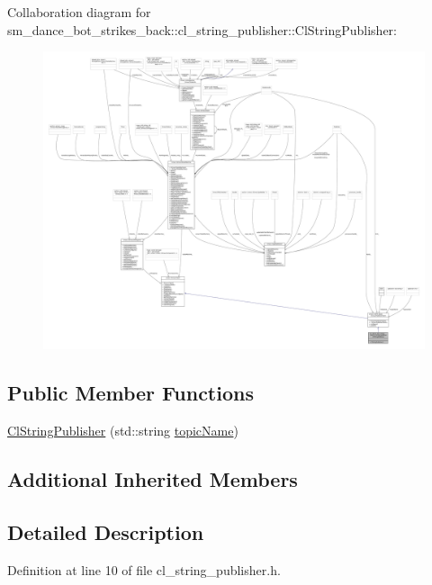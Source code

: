 Collaboration diagram for sm\+\_\+dance\+\_\+bot\+\_\+strikes\+\_\+back\+:\+:cl\+\_\+string\+\_\+publisher\+:\+:Cl\+String\+Publisher\+:
\nopagebreak
\begin{figure}[H]
\begin{center}
\leavevmode
\includegraphics[width=350pt]{classsm__dance__bot__strikes__back_1_1cl__string__publisher_1_1ClStringPublisher__coll__graph}
\end{center}
\end{figure}
\subsection*{Public Member Functions}
\begin{DoxyCompactItemize}
\item 
\hyperlink{classsm__dance__bot__strikes__back_1_1cl__string__publisher_1_1ClStringPublisher_a37f11f8a2f6f5092c04294fa930a6254}{Cl\+String\+Publisher} (std\+::string \hyperlink{classsmacc_1_1client__bases_1_1SmaccPublisherClient_a8b8d98aef9b3b3a441005d2cb17b4fcc}{topic\+Name})
\end{DoxyCompactItemize}
\subsection*{Additional Inherited Members}


\subsection{Detailed Description}


Definition at line 10 of file cl\+\_\+string\+\_\+publisher.\+h.



